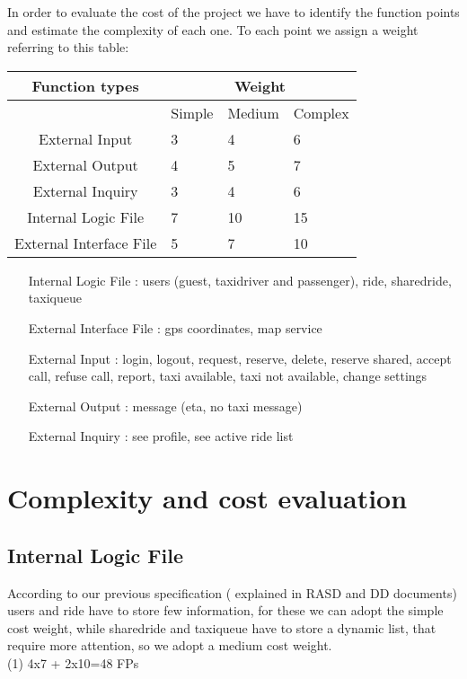 In order to evaluate the cost of the project we have to identify 
the function points and estimate the complexity of each one.
To each point we assign a weight referring to this table:\\

\begin{tabular}{ | c | l | l | l |}
    \hline
     Function types & \multicolumn{3}{|c|}{Weight} \\\hline
       & Simple  & Medium & Complex \\ \hline
    External Input & 3 & 4 & 6   \\ \hline
    External Output & 4 & 5 & 7 \\ \hline
    External Inquiry & 3 & 4  & 6 \\ \hline
    Internal Logic File & 7 & 10 & 15 \\ \hline
    External Interface File & 5 & 7 & 10  \\ \hline
    \end{tabular}

\begin{itemize}
  \item [Internal Logic File]: users (guest, taxidriver and passenger), 
                               ride, sharedride, taxiqueue
  \item[External Interface File]: gps coordinates, map service
  \item[External Input]: login, logout, request, reserve, delete, reserve shared,
                         accept call, refuse call, report, taxi available,
                         taxi not available, change settings
  \item[External Output]: message (eta, no taxi message)
  \item[External Inquiry]: see profile, see active ride list
\end{itemize}
\section{Complexity and cost evaluation}
  \subsection{ Internal Logic File}
  According to our previous specification ( explained in RASD and DD documents)
  users and ride have to store few information, for these we can adopt the
  simple cost weight, while sharedride and taxiqueue have to store a dynamic
  list, that require more attention, so we adopt a medium cost weight.\\
(1) 4x7 + 2x10=48 FPs
